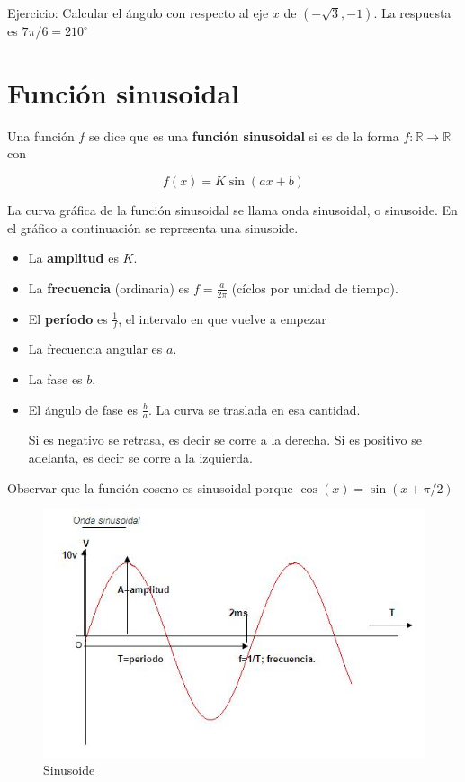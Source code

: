 Ejercicio: Calcular el ángulo con respecto al eje $x$ de $(- \sqrt{3}, -1)$.  La respuesta es $7\pi/6 = 210^{\circ}$

\section{Función sinusoidal}

\begin{definition} 
Una función $f$ se dice que es una \textbf{función sinusoidal} si es de la forma $f : \mathbb{R} \to \mathbb{R}$ con 

$$f(x) = K \sin(ax+b)$$

La curva gráfica de la función sinusoidal se llama onda sinusoidal, o sinusoide.  En el gráfico a continuación se representa una sinusoide.

\begin{itemize}
\item La \textbf{amplitud} es $\boxed{ K } $.

\item La \textbf{frecuencia} (ordinaria) es $ \boxed{f = \frac{a}{2\pi} }$ (cíclos por unidad de tiempo).

\item El \textbf{período} es $ \boxed{ \frac{1}{f} }$, el intervalo en que vuelve a empezar

\item La frecuencia angular es $a$.
\item La fase es $b$.
\item El ángulo de fase es $\frac{b}{a}$.  La curva se traslada en esa cantidad.

Si es negativo se retrasa, es decir se corre a la derecha.  Si es positivo se adelanta, es decir se corre a la izquierda.

\end{itemize}

Observar que la función coseno es sinusoidal porque $\cos(x) = \sin(x + \pi/2)$
\end{definition}

\begin{figure}[h]
\centering\includegraphics[scale=0.7]{images/01_precalculo/sinusoide.jpg}
\caption{Sinusoide}
\end{figure}

